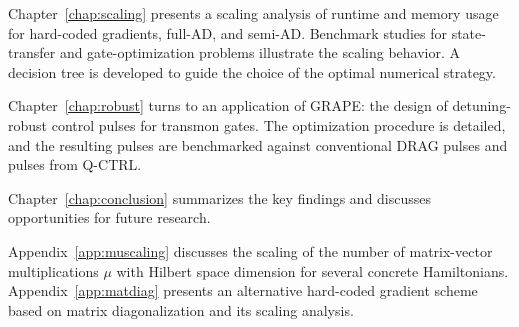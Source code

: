 Chapter~\ref{chap:scaling} presents a scaling analysis of runtime and memory usage for hard-coded gradients, full-AD, and semi-AD. Benchmark studies for state-transfer and gate-optimization problems illustrate the scaling behavior. A decision tree is developed to guide the choice of the optimal numerical strategy.

Chapter~\ref{chap:robust} turns to an application of GRAPE: the design of detuning-robust control pulses for transmon gates. The optimization procedure is detailed, and the resulting pulses are benchmarked against conventional DRAG pulses and pulses from Q-CTRL.

Chapter~\ref{chap:conclusion} summarizes the key findings and discusses opportunities for future research.

Appendix~\ref{app:muscaling} discusses the scaling of the number of matrix-vector multiplications $\mu$ with Hilbert space dimension for several concrete Hamiltonians. Appendix~\ref{app:matdiag} presents an alternative hard-coded gradient scheme based on matrix diagonalization and its scaling analysis.
